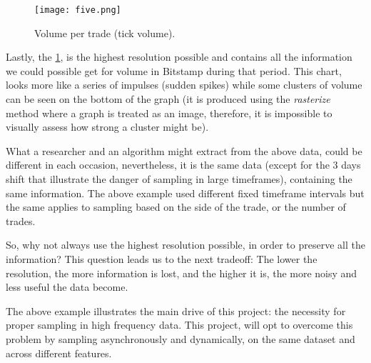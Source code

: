 \begin{figure}[h]
    \centering
    \texttt{[image: five.png]}
    \caption{Volume per trade (tick volume).}
    \label{fig:tick_vol}
\end{figure}

Lastly, the \ref{fig:tick_vol}, is the highest resolution possible and contains all the information we could possible get for volume in Bitstamp during that period. This chart, looks more like a series of impulses (sudden spikes) while some clusters of volume can be seen on the bottom of the graph (it is produced using the \textit{rasterize} method where a graph is treated as an image, therefore, it is impossible to visually assess how strong a cluster might be). 

What a researcher and an algorithm might extract from the above data, could be different in
each occasion, nevertheless, it is the same data (except for the 3 days shift that illustrate the danger of sampling in large timeframes), containing the same information. The above example used different fixed timeframe intervals but the same applies to sampling based on the side of the trade, or the number of trades. 

So, why not always use the highest resolution possible, in order to preserve all the information? This question leads us to the next tradeoff: The lower the resolution, the more information is lost, and the higher it is, the more noisy and less useful the data become.

The above example illustrates the main drive of this project: the necessity for proper sampling in high frequency data. This project, will opt to overcome this problem by sampling asynchronously and
dynamically, on the same dataset and across different features.


